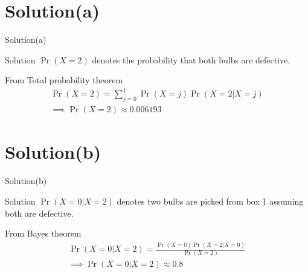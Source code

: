 \documentclass{beamer}
\providecommand{\pr}[1]{\ensuremath{\Pr\left(#1\right)}}
\begin{document}
\section{Solution(a)}
     \begin{frame}{Solution(a)}
     \begin{block}{Solution}
     $\pr{X=2}$ denotes the probability that both bulbs are defective.\\
     \end{block}
      From Total probability theorem
        \begin{align}
            \pr{X=2}=\sum_{j=0}^1\pr{X=j}\pr{X=2|X=j}\\
            \implies \boxed{\pr{X=2}\approx 0.006193}
        \end{align}
     \end{frame}
     
     
     \section{Solution(b)}
     \begin{frame}{Solution(b)}
     \begin{block}{Solution}
     $\pr{X=0|X=2}$ denotes two bulbs are picked from box 1 assuming both are defective.
     \end{block}
     From Bayes theorem
        \begin{align}
            \pr{X=0|X=2}=\frac{\pr{X=0}\pr{X=2|X=0}}{\pr{X=2}}\\
            \implies \boxed{\pr{X=0|X=2}\approx0.8}
        \end{align}
     \end{frame}
\end{document}
